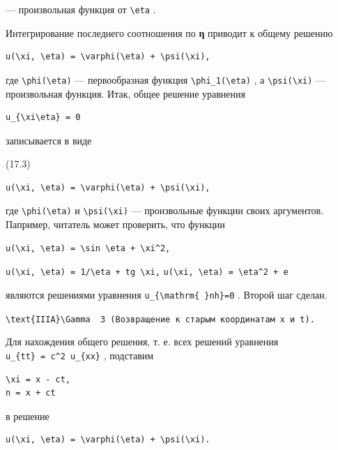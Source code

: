 \documentclass[
  ukrainian,
]{article}
\begin{document}
--- произвольная функция от \texttt{\textbackslash{}eta} .

Интегрирование последнего соотношения по \textbf{η} приводит к общему
решению

\begin{verbatim}
u(\xi, \eta) = \varphi(\eta) + \psi(\xi),
\end{verbatim}

где \texttt{\textbackslash{}phi(\textbackslash{}eta)} --- первообразная
функция \texttt{\textbackslash{}phi\_1(\textbackslash{}eta)} , а
\texttt{\textbackslash{}psi(\textbackslash{}xi)} --- произвольная
функция. Итак, общее решение уравнения

\begin{verbatim}
u_{\xi\eta} = 0
\end{verbatim}

записывается в виде

(17.3)

\begin{verbatim}
u(\xi, \eta) = \varphi(\eta) + \psi(\xi),
\end{verbatim}

где \texttt{\textbackslash{}phi(\textbackslash{}eta)} и
\texttt{\textbackslash{}psi(\textbackslash{}xi)} --- произвольные
функции своих аргументов. Папример, читатель может проверить, что
функции

\begin{verbatim}
u(\xi, \eta) = \sin \eta + \xi^2,
\end{verbatim}

\texttt{u(\textbackslash{}xi,\ \textbackslash{}eta)\ =\ 1/\textbackslash{}eta\ +\ tg\ \textbackslash{}xi,}
\texttt{u(\textbackslash{}xi,\ \textbackslash{}eta)\ =\ \textbackslash{}eta\^{}2\ +\ e}

являются решениями уравнения
\texttt{u\_\{\textbackslash{}mathrm\{\ \}nh\}=0} . Второй шаг сделан.

\texttt{\textquotesingle{}\textbackslash{}text\{IIIA\}\textbackslash{}Gamma\textquotesingle{}\ \ 3\ (Возвращение\ к\ старым\ координатам\ x\ и\ t).}

Для нахождения общего решения, т. е. всех решений уравнения
\texttt{u\_\{tt\}\ =\ c\^{}2\ u\_\{xx\}} , подставим

\begin{verbatim}
\xi = x - ct,
n = x + ct
\end{verbatim}

в решение

\begin{verbatim}
u(\xi, \eta) = \varphi(\eta) + \psi(\xi).
\end{verbatim}
\end{document}

